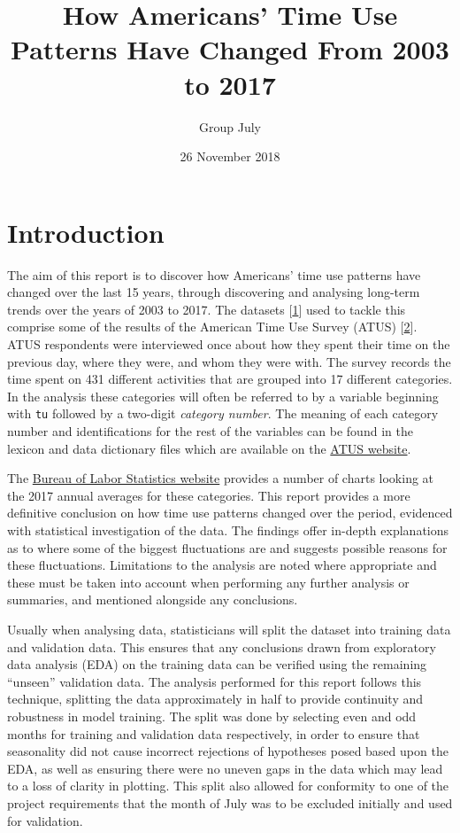 \documentclass[11pt,]{article}
\title{\textbf{How Americans' Time Use Patterns Have Changed From 2003 to 2017}}
\subtitle{Group July}
\author{}
\date{26 November 2018}
\begin{document}
\maketitle

\hypertarget{introduction}{%
\section{Introduction}\label{introduction}}

The aim of this report is to discover how Americans' time use patterns
have changed over the last 15 years, through discovering and analysing
long-term trends over the years of 2003 to 2017. The datasets
{[}\protect\hyperlink{ref-atusdatasets}{1}{]} used to tackle this
comprise some of the results of the American Time Use Survey (ATUS)
{[}\protect\hyperlink{ref-ATUS}{2}{]}. ATUS respondents were interviewed
once about how they spent their time on the previous day, where they
were, and whom they were with. The survey records the time spent on 431
different activities that are grouped into 17 different categories. In
the analysis these categories will often be referred to by a variable
beginning with \texttt{tu} followed by a two-digit \emph{category
number}. The meaning of each category number and identifications for the
rest of the variables can be found in the lexicon and data dictionary
files which are available on the
\href{https://www.bls.gov/tus/lexiconnoex0317.pdf}{ATUS website}.

The \href{https://www.bls.gov/tus/charts.htm}{Bureau of Labor Statistics
website} provides a number of charts looking at the 2017 annual averages
for these categories. This report provides a more definitive conclusion
on how time use patterns changed over the period, evidenced with
statistical investigation of the data. The findings offer in-depth
explanations as to where some of the biggest fluctuations are and
suggests possible reasons for these fluctuations. Limitations to the
analysis are noted where appropriate and these must be taken into
account when performing any further analysis or summaries, and mentioned
alongside any conclusions.

Usually when analysing data, statisticians will split the dataset into
training data and validation data. This ensures that any conclusions
drawn from exploratory data analysis (EDA) on the training data can be
verified using the remaining ``unseen'' validation data. The analysis
performed for this report follows this technique, splitting the data
approximately in half to provide continuity and robustness in model
training. The split was done by selecting even and odd months for
training and validation data respectively, in order to ensure that
seasonality did not cause incorrect rejections of hypotheses posed based
upon the EDA, as well as ensuring there were no uneven gaps in the data
which may lead to a loss of clarity in plotting. This split also allowed
for conformity to one of the project requirements that the month of July
was to be excluded initially and used for validation.
\end{document}
